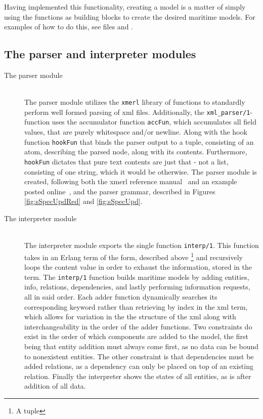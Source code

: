 Having implemented this functionality, creating a model is a matter of simply using the functions as building blocks to create the desired maritime models. For examples of how to do this, see files  and .

\subsection{The parser and interpreter modules}

\begin{description}
	\item[The parser module]\ \\
		The parser module utilizes the \lstinline{xmerl} library of functions to standardly perform well formed parsing of xml files. Additionally, the \lstinline{xml_parser/1}-function uses the accumulator function \lstinline{accFun}, which accumulates all field values, that are  purely whitespace and/or newline. Along with the hook function \lstinline{hookFun} that binds the parser output to a tuple, consisting of an atom, describing the parsed node, along with its contents. Furthermore, \lstinline{hookFun} dictates that pure text contents are just that - not a list, consisting of one string, which it would be otherwise. The parser module is created, following both the xmerl reference manual~\cite{xmerl} and an example posted online~\cite{xmerlEx}, and the parser grammar, described in Figures \ref{fig:sSpecUpdRed} and \ref{fig:sSpecUpd}.
	\item[The interpreter module]\ \\
		The interpreter module exports the single function \lstinline{interp/1}. This function takes in an Erlang term of the form, described above \footnote{A tuple} and recursively loops the content value in order to exhaust the information, stored in the term. The \lstinline{interp/1} function builds maritime models by adding entities, info, relations, dependencies, and lastly performing information requests, all in said order. Each adder function dynamically searches its corresponding keyword rather than retrieving by index in the xml term, which allows for variation in the the structure of the xml along with interchangeability in the order of the adder functions. Two constraints do exist in the order of which components are added to the model, the first being that entity addition must always come first, as no data can be bound to nonexistent entities. The other constraint is that dependencies must be added  relations, as a dependency can only be placed on top of an existing relation. Finally the interpreter shows the states of all entities, as is after addition of all data.
\end{description}
